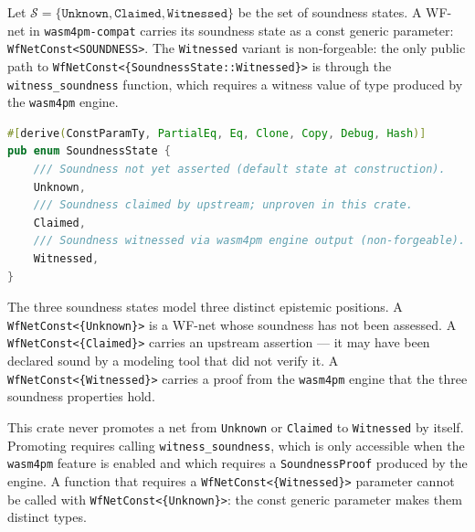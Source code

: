 \begin{definition}
\label{def:wfnet-soundness}
Let $\mathcal{S} = \{\texttt{Unknown}, \texttt{Claimed}, \texttt{Witnessed}\}$ be the
set of soundness states. A WF-net in \texttt{wasm4pm-compat} carries its soundness state
as a const generic parameter: \texttt{WfNetConst<SOUNDNESS>}. The \texttt{Witnessed}
variant is non-forgeable: the only public path to
\texttt{WfNetConst<\{SoundnessState::Witnessed\}>} is through the \texttt{witness\_soundness}
function, which requires a witness value of type produced by the \texttt{wasm4pm} engine.
\end{definition}

\begin{lstlisting}[language=Rust,
  caption={The three WF-net soundness states as a \texttt{ConstParamTy} enum in
    \texttt{src/law.rs}. \texttt{Witnessed} is the non-forgeable state.},
  label={lst:wfnet-soundness}]
#[derive(ConstParamTy, PartialEq, Eq, Clone, Copy, Debug, Hash)]
pub enum SoundnessState {
    /// Soundness not yet asserted (default state at construction).
    Unknown,
    /// Soundness claimed by upstream; unproven in this crate.
    Claimed,
    /// Soundness witnessed via wasm4pm engine output (non-forgeable).
    Witnessed,
}
\end{lstlisting}

The three soundness states model three distinct epistemic positions. A
\texttt{WfNetConst<\{Unknown\}>} is a WF-net whose soundness has not been assessed. A
\texttt{WfNetConst<\{Claimed\}>} carries an upstream assertion --- it may have been declared
sound by a modeling tool that did not verify it. A \texttt{WfNetConst<\{Witnessed\}>}
carries a proof from the \texttt{wasm4pm} engine that the three soundness properties hold.

\begin{remark}
\label{rem:soundness-claim}
This crate never promotes a net from \texttt{Unknown} or \texttt{Claimed} to
\texttt{Witnessed} by itself. Promoting requires calling \texttt{witness\_soundness}, which
is only accessible when the \texttt{wasm4pm} feature is enabled and which requires a
\texttt{SoundnessProof} produced by the engine. A function that requires a
\texttt{WfNetConst<\{Witnessed\}>} parameter cannot be called with
\texttt{WfNetConst<\{Unknown\}>}: the const generic parameter makes them distinct types.
\end{remark}

